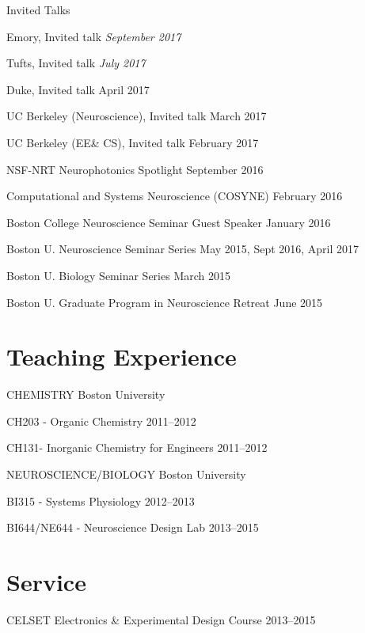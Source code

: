 \halfblankline

Invited Talks
\begin{innerlist}

\item Emory, Invited talk \hfill \emph{\color{Maroon} September 2017}
\item Tufts, Invited talk \hfill \emph{\color{Maroon} July 2017}
\item Duke, Invited talk \hfill April 2017
\item  UC Berkeley (Neuroscience), Invited talk \hfill March 2017
\item  UC Berkeley (EE\& CS), Invited talk \hfill February 2017
\item NSF-NRT Neurophotonics Spotlight  \hfill September 2016
\item Computational and Systems Neuroscience (COSYNE) \hfill February 2016
\item Boston College Neuroscience Seminar Guest Speaker \hfill January 2016
\item Boston U. Neuroscience Seminar Series \hfill May 2015, Sept 2016, April 2017
\item Boston U. Biology Seminar Series \hfill March 2015
\item Boston U. Graduate Program in Neuroscience Retreat \hfill June 2015
\end{innerlist}


\section{Teaching Experience}

CHEMISTRY Boston University
\begin{innerlist}
\item[] CH203 - Organic Chemistry \hfill {2011--2012}\

	CH131- Inorganic Chemistry for Engineers \hfill {2011--2012}\
\end{innerlist}

\halfblankline

NEUROSCIENCE/BIOLOGY Boston University
\begin{innerlist}
\item[] BI315 - Systems Physiology \hfill {2012--2013}\

BI644/NE644 - Neuroscience Design Lab \hfill {2013--2015}\


\end{innerlist}

\section{Service}
CELSET Electronics \& Experimental Design Course  \hfill {2013--2015}

